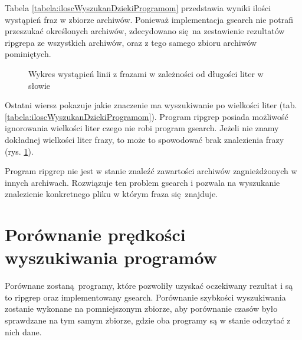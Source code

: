 Tabela \ref{tabela:iloscWyszukanDziekiProgramom} przedstawia wyniki ilości 
wystąpień fraz w zbiorze archiwów. Ponieważ implementacja gsearch nie potrafi
przeszukać określonych archiwów, zdecydowano się na zestawienie rezultatów
ripgrepa ze wszystkich archiwów, oraz z tego samego zbioru archiwów pominiętych. 

\begin{figure}[ht]
    \centering
    \caption{Wykres wystąpień linii z frazami w zależności od długości liter w słowie }
    \label{fig:wykresPorównaniaIlosciWystapień}
\end{figure}

Ostatni wiersz pokazuje jakie znaczenie ma wyszukiwanie po wielkości liter 
(tab. \ref{tabela:iloscWyszukanDziekiProgramom}). Program ripgrep posiada 
możliwość ignorowania wielkości liter czego nie robi program gsearch. Jeżeli
nie znamy dokładnej wielkości liter frazy, to może to spowodować brak 
znalezienia frazy (rys. \ref{fig:wykresPorównaniaIlosciWystapień}). 


Program ripgrep nie jest w stanie znaleźć zawartości archiwów zagnieżdżonych w
innych archiwach. Rozwiązuje ten problem gsearch i pozwala na wyszukanie 
znalezienie konkretnego pliku w którym fraza się znajduje.

\section{Porównanie prędkości wyszukiwania programów}

Porównane zostaną programy, które pozwoliły uzyskać oczekiwany rezultat i są to
ripgrep oraz implementowany gsearch. 
Porównanie szybkości wyszukiwania zostanie wykonane na pomniejszonym zbiorze,
aby porównanie czasów było sprawdzane na tym samym zbiorze, gdzie oba programy
są w stanie odczytać z nich dane.

